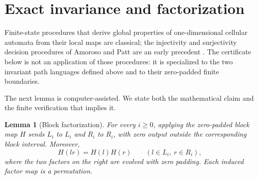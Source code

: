 \documentclass[11pt]{article}
\newtheorem{lemma}[theorem]{Lemma}
\theoremstyle{remark}
\begin{document}
\section{Exact invariance and factorization}

Finite-state procedures that derive global properties of one-dimensional
cellular automata from their local maps are classical; the injectivity and
surjectivity decision procedures of Amoroso and Patt are an early precedent
\cite{AmorosoPatt1972}.  The certificate below is not an application of those
procedures: it is specialized to the two invariant path languages defined
above and to their zero-padded finite boundaries.

The next lemma is computer-assisted.  We state both the mathematical claim and
the finite verification that implies it.

\begin{lemma}[Block factorization]\label{lem:factorization}
For every $i\geq0$, applying the zero-padded block map $H$ sends $L_i$ to
$L_i$ and $R_i$ to $R_i$, with zero output outside the corresponding block
interval.  Moreover,
\begin{equation}\label{eq:decouple}
 H(lr)=H(l)H(r)\qquad(l\in L_i,\ r\in R_i),
\end{equation}
where the two factors on the right are evolved with zero padding.  Each
induced factor map is a permutation.
\end{lemma}
\end{document}
